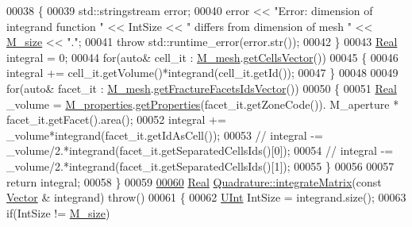 \begin{DoxyCode}
00038     \{
00039         std::stringstream error;
00040         error << \textcolor{stringliteral}{"Error: dimension of integrand function "} << IntSize << \textcolor{stringliteral}{" differs from dimension of mesh "}
       << \hyperlink{classFVCode3D_1_1Quadrature_ae0ab248f031fa026887c4e1fb91a3835}{M\_size} << \textcolor{stringliteral}{"."};
00041         \textcolor{keywordflow}{throw} std::runtime\_error(error.str());
00042     \}
00043     \hyperlink{namespaceFVCode3D_a40c1f5588a248569d80aa5f867080e83}{Real} integral = 0;
00044     \textcolor{keywordflow}{for}(\textcolor{keyword}{auto}& cell\_it : \hyperlink{classFVCode3D_1_1Quadrature_abaa2519ea32065df30242bd5f5cb2d01}{M\_mesh}.\hyperlink{classFVCode3D_1_1Rigid__Mesh_afefb62f2c37317402b495e2369ed495b}{getCellsVector}())
00045     \{
00046         integral += cell\_it.getVolume()*integrand(cell\_it.getId());
00047     \}
00048 
00049     \textcolor{keywordflow}{for}(\textcolor{keyword}{auto}& facet\_it : \hyperlink{classFVCode3D_1_1Quadrature_abaa2519ea32065df30242bd5f5cb2d01}{M\_mesh}.\hyperlink{classFVCode3D_1_1Rigid__Mesh_aadbe6d9ad704122537903396d91238e0}{getFractureFacetsIdsVector}())
00050     \{
00051         \hyperlink{namespaceFVCode3D_a40c1f5588a248569d80aa5f867080e83}{Real} \_volume = \hyperlink{classFVCode3D_1_1Quadrature_ace6cd23087209d3186ae173c265cde39}{M\_properties}.\hyperlink{classFVCode3D_1_1PropertiesMap_ace888d15c9a4ab13d5e217a3a565604c}{getProperties}(facet\_it.getZoneCode()).
      M\_aperture * facet\_it.getFacet().area();
00052         integral += \_volume*integrand(facet\_it.getIdAsCell());
00053 \textcolor{comment}{//        integral -= \_volume/2.*integrand(facet\_it.getSeparatedCellsIds()[0]);}
00054 \textcolor{comment}{//        integral -= \_volume/2.*integrand(facet\_it.getSeparatedCellsIds()[1]);}
00055     \}
00056 
00057     \textcolor{keywordflow}{return} integral;
00058 \}
00059 
\hypertarget{Quadrature_8cpp_source.tex_l00060}{}\hyperlink{classFVCode3D_1_1Quadrature_a2dc75b0980ba9e7edb74c5d8752b15b0}{00060} \hyperlink{namespaceFVCode3D_a40c1f5588a248569d80aa5f867080e83}{Real} \hyperlink{classFVCode3D_1_1Quadrature_a1b9bd586f125dcda6d4aaebcdda83b80}{Quadrature::integrateMatrix}(\textcolor{keyword}{const} \hyperlink{namespaceFVCode3D_a16ccf345652402bccd1a5d2e6782526c}{Vector} & integrand) \textcolor{keywordflow}{throw}()
00061 \{
00062     \hyperlink{namespaceFVCode3D_a4bf7e328c75d0fd504050d040ebe9eda}{UInt} IntSize = integrand.size();
00063     \textcolor{keywordflow}{if}(IntSize != \hyperlink{classFVCode3D_1_1Quadrature_ae0ab248f031fa026887c4e1fb91a3835}{M\_size})

\end{DoxyCode}
